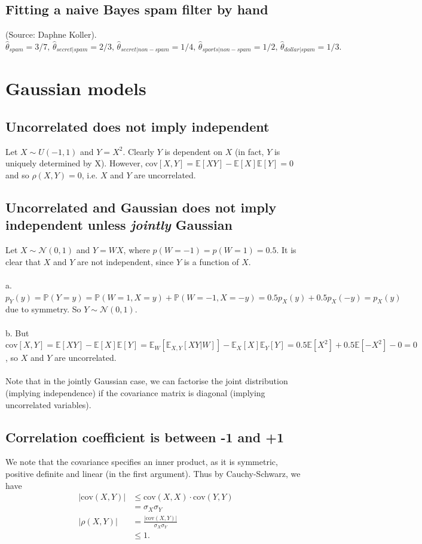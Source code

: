 \documentclass{article}
\begin{document}
\subsection{Fitting a naive Bayes spam filter by hand}
(Source: Daphne Koller). $\hat\theta_{spam} = 3/7,\, \hat\theta_{secret|spam} = 2/3,\, \hat\theta_{secret|non-spam} = 1/4,\, \hat\theta_{sports|non-spam} = 1/2,\, \hat\theta_{dollar|spam} = 1/3.$
\pagebreak

\section{Gaussian models}
\subsection{Uncorrelated does not imply independent}
Let $X \sim U(-1,1)$ and $Y = X^2$. Clearly $Y$ is dependent on $X$ (in fact, $Y$ is uniquely determined by X). However, $\mathrm{cov}[X,Y] = \mathbb{E}[XY]-\mathbb{E}[X]\mathbb{E}[Y] = 0$ and so $\rho(X,Y)=0$, i.e. $X$ and $Y$ are uncorrelated.

\subsection{Uncorrelated and Gaussian does not imply independent unless \textit{jointly} Gaussian}
Let $X \sim \mathcal{N}(0,1)$ and $Y=WX$, where $p(W=-1)=p(W=1)=0.5$. It is clear that $X$ and $Y$ are not independent, since $Y$ is a function of $X$.\\\\
a. $p_Y(y) = \mathbb{P}(Y=y) = \mathbb{P}(W=1,X=y) + \mathbb{P}(W=-1,X=-y) = 0.5p_X(y) + 0.5p_X(-y) = p_X(y)$ due to symmetry. So $Y \sim \mathcal{N}(0,1)$.\\\\
b. But $\mathrm{cov}[X,Y] = \mathbb{E}[XY] - \mathbb{E}[X]\mathbb{E}[Y] = \mathbb{E}_W[\mathbb{E}_{X,Y}[XY|W]] - \mathbb{E}_X[X]\mathbb{E}_Y[Y] = 0.5\mathbb{E}[X^2] + 0.5\mathbb{E}[-X^2] - 0 = 0$, so $X$ and $Y$ are uncorrelated.\\\\
Note that in the jointly Gaussian case, we can factorise the joint distribution (implying independence) if the covariance matrix is diagonal (implying uncorrelated variables).

\subsection{Correlation coefficient is between -1 and +1}
We note that the covariance specifies an inner product, as it is symmetric, positive definite and linear (in the first argument). Thus by Cauchy-Schwarz, we have
\begin{align*}
|\mathrm{cov}(X,Y)| &\leq \mathrm{cov}(X,X) \cdot \mathrm{cov}(Y,Y)\\
&= \sigma_X\sigma_Y\\
|\rho(X,Y)| &= \frac{|\mathrm{cov}(X,Y)|}{\sigma_X\sigma_Y}\\
&\leq 1.
\end{align*}
\end{document}

